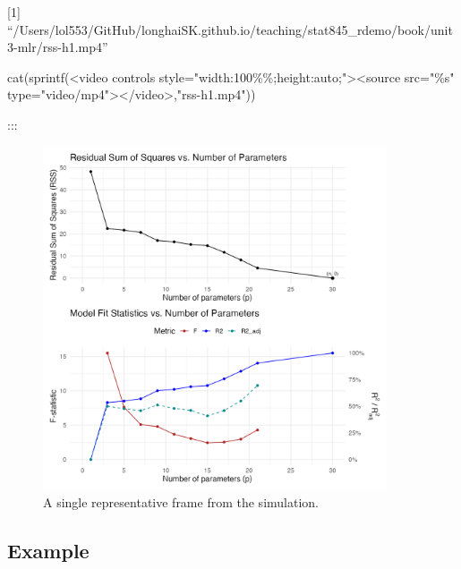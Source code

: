 \documentclass[
  letterpaper,
]{scrbook}
\newenvironment{Shaded}{\begin{snugshade}}{\end{snugshade}}
\newcommand{\FunctionTok}[1]{\textcolor[rgb]{0.28,0.35,0.67}{#1}}
\newcommand{\NormalTok}[1]{\textcolor[rgb]{0.00,0.23,0.31}{#1}}
\newcommand{\StringTok}[1]{\textcolor[rgb]{0.13,0.47,0.30}{#1}}
\begin{document}
{[}1{]}
``/Users/lol553/GitHub/longhaiSK.github.io/teaching/stat845\_rdemo/book/unit3-mlr/rss-h1.mp4''

\begin{Shaded}
\begin{Highlighting}[]
\FunctionTok{cat}\NormalTok{(}\FunctionTok{sprintf}\NormalTok{(}\StringTok{\textquotesingle{}\textless{}video controls style="width:100\%\%;height:auto;"\textgreater{}\textless{}source src="\%s" type="video/mp4"\textgreater{}\textless{}/video\textgreater{}\textquotesingle{}}\NormalTok{,}\StringTok{"rss{-}h1.mp4"}\NormalTok{))}
\end{Highlighting}
\end{Shaded}

:::

\begin{figure}[H]

{\centering \includegraphics[width=4in,height=\textheight]{unit3-mlr/frames1/f001.png}

}

\caption{A single representative frame from the simulation.}

\end{figure}%

\subsection{Example}\label{example}
\end{document}
